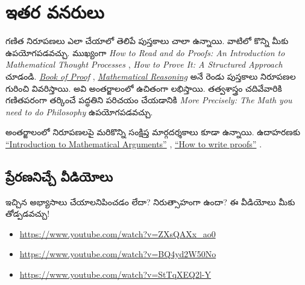\documentclass[../../../include/open-logic-section]{subfiles}
\begin{document}

\section{ఇతర వనరులు}

గణిత నిరూపణలు ఎలా చేయాలో తెలిపే పుస్తకాలు చాలా ఉన్నాయి. వాటిలో కొన్ని మీకు ఉపయోగపడవచ్చు. ముఖ్యంగా \emph{How to Read and do Proofs: An Introduction to Mathematical Thought Processes} \citep{Solow2013}, \emph{How to Prove It: A Structured Approach} \citep{Velleman2019} చూడండి. \href{http://www.people.vcu.edu/~rhammack/BookOfProof/BookOfProof.pdf}{\emph{Book of Proof}} \citep{Hammack2013}, \href{https://scholarworks.gvsu.edu/books/7/}{\emph{Mathematical Reasoning}} \citep{Sandstrum2019} అనే రెండు పుస్తకాలు నిరూపణల గురించి వివరిస్తాయి. అవి అంతర్జాలంలో ఉచితంగా లభిస్తాయి. తత్వశాస్త్రం చదివేవారికి గణితపరంగా తర్కించే పద్ధతిని పరిచయం చేయడానికి \emph{More Precisely: The Math you need to do Philosophy} \citep{Steinhart2018} ఉపయోగపడవచ్చు.

అంతర్జాలంలో నిరూపణలపై మరికొన్ని సంక్షిప్త మార్గదర్శకాలు కూడా ఉన్నాయి. ఉదాహరణకు \href{https://math.berkeley.edu/~hutching/teach/proofs.pdf}{``Introduction to Mathematical Arguments''} \citep{Hutchings2003}, \href{https://eugeniacheng.com/wp-content/uploads/2017/02/cheng-proofguide.pdf}{``How to write proofs''} \citep{Cheng2004}.

\subsection{ప్రేరణనిచ్చే వీడియోలు}

ఇచ్చిన అభ్యాసాలు చేయాలనిపించడం లేదా? నిరుత్సాహంగా ఉందా? ఈ వీడియోలు మీకు తోడ్పడవచ్చు!

\begin{itemize}
\item \url{https://www.youtube.com/watch?v=ZXsQAXx_ao0}
\item \url{https://www.youtube.com/watch?v=BQ4yd2W50No}
\item \url{https://www.youtube.com/watch?v=StTqXEQ2l-Y}
\end{itemize}
\end{document}
